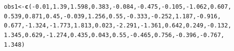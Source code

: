 \documentclass{report}\usepackage[]{graphicx}\usepackage[]{color}
\makeatletter
\newcommand{\hlnum}[1]{\textcolor[rgb]{0.686,0.059,0.569}{#1}}%
\newcommand{\hlopt}[1]{\textcolor[rgb]{0,0,0}{#1}}%
\newcommand{\hlstd}[1]{\textcolor[rgb]{0.345,0.345,0.345}{#1}}%
\newcommand{\hlkwb}[1]{\textcolor[rgb]{0.69,0.353,0.396}{#1}}%
\newcommand{\hlkwd}[1]{\textcolor[rgb]{0.737,0.353,0.396}{\textbf{#1}}}%
\newenvironment{kframe}{%
 \def\at@end@of@kframe{}%
 \ifinner\ifhmode%
  \def\at@end@of@kframe{\end{minipage}}%
  \begin{minipage}{\columnwidth}%
 \fi\fi%
 \def\FrameCommand##1{\hskip\@totalleftmargin \hskip-\fboxsep
 \colorbox{shadecolor}{##1}\hskip-\fboxsep
     \hskip-\linewidth \hskip-\@totalleftmargin \hskip\columnwidth}%
 \MakeFramed {\advance\hsize-\width
   \@totalleftmargin\z@ \linewidth\hsize
   \@setminipage}}%
 {\par\unskip\endMakeFramed%
 \at@end@of@kframe}
\newenvironment{knitrout}{}{} %
\makeatother
\begin{document}
\begin{knitrout}
\color{fgcolor}\begin{kframe}
\begin{alltt}
\hlstd{obs1} \hlkwb{<-} \hlkwd{c}\hlstd{(}\hlopt{-}\hlnum{0.01}\hlstd{,} \hlnum{1.39}\hlstd{,} \hlnum{1.598}\hlstd{,} \hlnum{0.383}\hlstd{,} \hlopt{-}\hlnum{0.084}\hlstd{,} \hlopt{-}\hlnum{0.475}\hlstd{,} \hlopt{-}\hlnum{0.105}\hlstd{,} \hlopt{-}\hlnum{1.062}\hlstd{,} \hlnum{0.607}\hlstd{,}
    \hlnum{0.539}\hlstd{,} \hlnum{0.871}\hlstd{,} \hlnum{0.45}\hlstd{,} \hlopt{-}\hlnum{0.039}\hlstd{,} \hlnum{1.256}\hlstd{,} \hlnum{0.55}\hlstd{,} \hlopt{-}\hlnum{0.333}\hlstd{,} \hlopt{-}\hlnum{0.252}\hlstd{,} \hlnum{1.187}\hlstd{,} \hlopt{-}\hlnum{0.916}\hlstd{,}
    \hlnum{0.677}\hlstd{,} \hlopt{-}\hlnum{1.324}\hlstd{,} \hlopt{-}\hlnum{1.773}\hlstd{,} \hlnum{1.813}\hlstd{,} \hlnum{0.023}\hlstd{,} \hlopt{-}\hlnum{2.291}\hlstd{,} \hlopt{-}\hlnum{1.361}\hlstd{,} \hlnum{0.642}\hlstd{,} \hlnum{0.249}\hlstd{,} \hlopt{-}\hlnum{0.132}\hlstd{,}
    \hlnum{1.345}\hlstd{,} \hlnum{0.629}\hlstd{,} \hlopt{-}\hlnum{1.274}\hlstd{,} \hlnum{0.435}\hlstd{,} \hlnum{0.043}\hlstd{,} \hlnum{0.55}\hlstd{,} \hlopt{-}\hlnum{0.465}\hlstd{,} \hlnum{0.756}\hlstd{,} \hlopt{-}\hlnum{0.396}\hlstd{,} \hlopt{-}\hlnum{0.767}\hlstd{,}
    \hlnum{1.348}\hlstd{)}


\end{alltt}
\end{kframe}
\end{knitrout}
\end{document}
